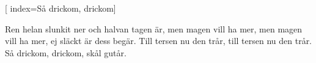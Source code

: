 [
	index={Så drickom, drickom}]		
	
\beginverse*						
Ren helan slunkit ner 
och halvan tagen är, 
men magen vill ha mer, 
men magen vill ha mer, 
ej släckt är dess begär. 
Till tersen nu den trår, 
till tersen nu den trår. 
Så drickom, drickom, skål gutår.
\endverse										
\endsong		
